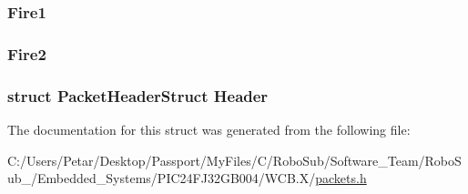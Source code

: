 \subsubsection[{Fire1}]{ Fire1}\label{struct_packet_torpedo_set_struct_a1b9060a8e227edc15703bd04103db303}
\hypertarget{struct_packet_torpedo_set_struct_ac7f6ba4d7f60290dbc0270a43783c858}{}
\subsubsection[{Fire2}]{ Fire2}\label{struct_packet_torpedo_set_struct_ac7f6ba4d7f60290dbc0270a43783c858}
\hypertarget{struct_packet_torpedo_set_struct_ab201af50281aff5ed4f984f994938007}{}
\subsubsection[{Header}]{\setlength{\rightskip}{0pt plus 5cm}struct {\bf Packet\+Header\+Struct} Header}\label{struct_packet_torpedo_set_struct_ab201af50281aff5ed4f984f994938007}


The documentation for this struct was generated from the following file\+:\begin{DoxyCompactItemize}
\item 
C\+:/\+Users/\+Petar/\+Desktop/\+Passport/\+My\+Files/\+C/\+Robo\+Sub/\+Software\+\_\+\+Team/\+Robo\+Sub\+\_/\+Embedded\+\_\+\+Systems/\+P\+I\+C24\+F\+J32\+G\+B004/\+W\+C\+B.\+X/\hyperlink{_w_c_b_8_x_2packets_8h}{packets.\+h}\end{DoxyCompactItemize}
